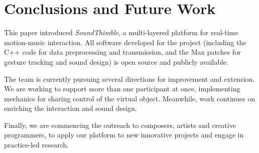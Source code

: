 %
%



\section{Conclusions and Future Work}
\label{sec:conc}

This paper introduced \textit{SoundThimble}, a multi-layered platform for real-time motion-music interaction.
All software developed for the project (including the C++ code for data preprocessing and transmission, and the Max patches for gesture tracking and sound design) is open source and publicly available.

The team is currently pursuing several directions for improvement and extension. We are working to support more than one participant at once, implementing mechanics for sharing control of the virtual object. %
Meanwhile, work continues on enriching the interaction and sound design.


Finally, we are commencing the outreach to composers, artists and creative programmers, to apply our platform to new innovative projects and engage in practice-led research.
